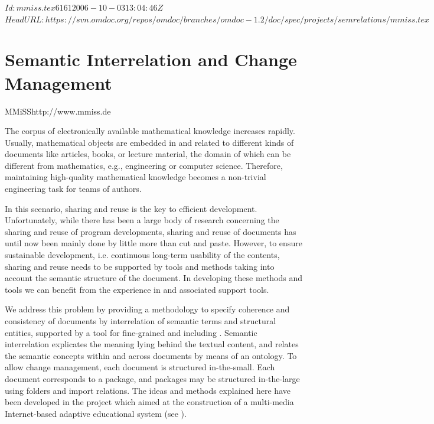 \svnInfo $Id: mmiss.tex 6161 2006-10-03 13:04:46Z  $
\svnKeyword $HeadURL: https://svn.omdoc.org/repos/omdoc/branches/omdoc-1.2/doc/spec/projects/semrelations/mmiss.tex $

\section{Semantic Interrelation and Change Management}
\begin{project}{MMiSS}{http://www.mmiss.de}
\end{project}
The corpus of electronically available mathematical knowledge increases rapidly.  Usually,
mathematical objects are embedded in and related to different kinds of documents like
articles, books, or lecture material, the domain of which can be different from
mathematics, e.g., engineering or computer science. Therefore, maintaining high-quality
mathematical knowledge becomes a non-trivial engineering task for teams of authors.

In this scenario, sharing and reuse is the
key to efficient development. Unfortunately, while there has been a large body of research
concerning the sharing and reuse of program developments, sharing and reuse of documents
has until now been mainly done by little more than cut and paste.  However, to ensure
sustainable development, i.e. continuous long-term usability of the contents, sharing and
reuse needs to be supported by tools and methods taking into account the semantic
structure of the document. In developing these methods and tools we can benefit from the
experience in {} and associated support tools.

We address this problem by providing a methodology to specify coherence and consistency of
documents by interrelation of semantic terms and structural entities, supported by a tool
for fine-grained {} and {}
including {}. Semantic
interrelation explicates the meaning lying behind the
textual content, and relates the semantic concepts within and across documents by means of
an ontology. To allow change management, each document is structured in-the-small.  Each
document corresponds to a package, and packages may be structured in-the-large using
folders and import relations. The ideas and methods explained here have been developed in
the \MMISS{} project which aimed at the construction of a multi-media Internet-based
adaptive educational system (see \cite{MMISS-WADT03,SemInter-DELFI04,MMISS-TechReport04}).

